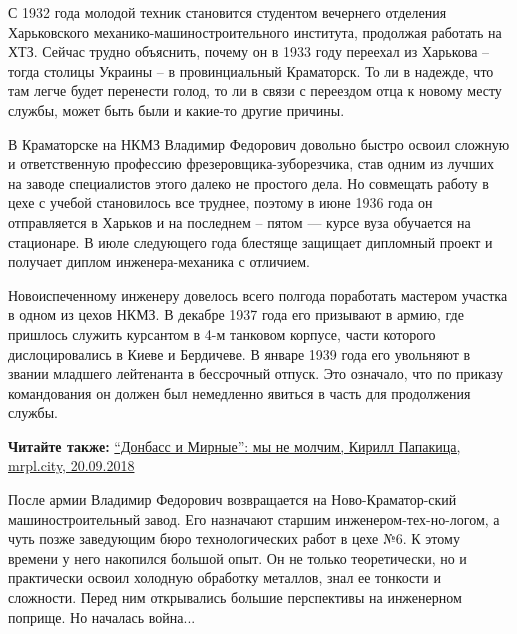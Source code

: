 С 1932 года молодой техник становится студентом вечернего отделения
Харьковского механико-машиностроительного института, продолжая работать на ХТЗ.
Сейчас трудно объяснить, почему он в 1933 году переехал из Харькова – тогда
столицы Украины – в провинциальный Краматорск. То ли в надежде, что там легче
будет перенести голод, то ли в связи с переездом отца к новому месту службы,
может быть были и какие-то другие причины.

В Краматорске на НКМЗ Владимир Федорович довольно быстро освоил сложную и
ответственную профессию фрезеровщика-зуборезчика, став одним из лучших на
заводе специалистов этого далеко не простого дела. Но совмещать работу в цехе с
учебой становилось все труднее, поэтому в июне 1936 года он отправляется в
Харьков и на последнем – пятом —  курсе вуза обучается на стационаре. В июле
следующего года блестяще защищает дипломный проект и получает диплом
инженера-механика с отличием.

Новоиспеченному инженеру довелось всего полгода поработать мастером участка в
одном из цехов НКМЗ. В декабре 1937 года его призывают в армию, где пришлось
служить курсантом в 4-м танковом корпусе, части которого дислоцировались в
Киеве и Бердичеве. В январе 1939 года его увольняют в звании младшего
лейтенанта в бессрочный отпуск. Это означало, что по приказу командования он
должен был немедленно явиться в часть для продолжения службы.

\textbf{Читайте также:} \href{https://mrpl.city/blogs/view/donbass-i-mirnye-my-ne-molchim}{%
\enquote{Донбасс и Мирные}: мы не молчим, Кирилл Папакица, mrpl.city, 20.09.2018}

После армии Владимир Федорович возвращается на Ново-Краматор\hyp{}ский
машиностроительный завод. Его назначают старшим инженером-тех\hyp{}но\hyp{}логом, а чуть
позже заведующим бюро технологических работ в цехе №6. К этому времени у него
накопился большой опыт. Он не только теоретически, но и практически освоил
холодную обработку металлов, знал ее тонкости и сложности. Перед ним
открывались большие перспективы на инженерном поприще. Но началась война...


